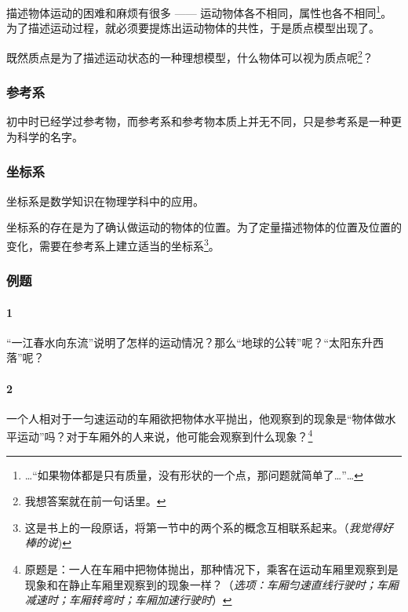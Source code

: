 				描述物体运动的困难和麻烦有很多 ------ 运动物体各不相同，属性也各不相同\footnote{\ldots “如果物体都是只有质量，没有形状的一个点，那问题就简单了\ldots ”\ldots}。%
				为了描述运动过程，就必须要提炼出运动物体的共性，于是质点模型出现了。

				既然质点是为了描述运动状态的一种理想模型，什么物体可以视为质点呢\footnote{我想答案就在前一句话里。}？

			\subsubsection*{参考系}
				初中时已经学过参考物，而参考系和参考物本质上并无不同，只是参考系是一种更为科学的名字。

			\subsubsection*{坐标系}
				坐标系是数学知识在物理学科中的应用。

				坐标系的存在是为了确认做运动的物体的位置。为了定量描述物体的位置及位置的变化，需要在参考系上建立适当的坐标系\footnote{这是书上的一段原话，将第一节中的两个系的概念互相联系起来。（\emph{我觉得好棒的说})}。

			\subsubsection{例题}
				\paragraph{1}
					“一江春水向东流”说明了怎样的运动情况？那么“地球的公转”呢？“太阳东升西落”呢？
				\paragraph{2}
					一个人相对于一匀速运动的车厢欲把物体水平抛出，他观察到的现象是“物体做水平运动”吗？对于车厢外的人来说，他可能会观察到什么现象？\footnote{原题是：一人在车厢中把物体抛出，那种情况下，乘客在运动车厢里观察到是现象和在静止车厢里观察到的现象一样？（\emph{选项：车厢匀速直线行驶时；车厢减速时；车厢转弯时；车厢加速行驶时}）}
